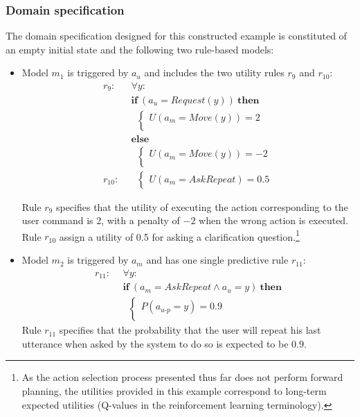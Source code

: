 \subsubsection*{Domain specification}

The domain specification designed for this constructed example is constituted of an empty initial state and the following two rule-based models: \begin{itemize}
\item Model $m_1$ is triggered by $a_u$ and includes the two utility rules $r_{9}$ and $r_{10}$:
\begin{align*}
r_{9}: \ \ & \forall y: \\ 
& \textbf{if} \ (a_u = Request(y)) \ \textbf{then} \\ 
& \; \; \begin{cases} 
U(a_m = Move(y)) = 2 \\ 
\end{cases} \\
& \textbf{else} \\ 
& \; \; \begin{cases} 
U(a_m = Move(y)) = -2 \\ 
\end{cases} \\[4mm]
r_{10}: \ \ &  \; \; \begin{cases} U(a_m = \mathit{AskRepeat}) = 0.5 \end{cases}
\end{align*}

Rule $r_{9}$ specifies that the utility of executing the action corresponding to the user command is 2, with a penalty of $-2$ when the wrong action is executed. Rule $r_{10}$ assign a utility of 0.5 for asking a clarification question.\footnote{As the action selection process presented thus far does not perform forward planning, the utilities provided in this example correspond to long-term expected utilities (Q-values in the reinforcement learning terminology).}

\item Model $m_2$ is triggered by $a_m$ and has one single predictive rule $r_{11}$: 
\begin{align*}
r_{11}: \ \ & \forall y: \\ 
& \textbf{if} \ (a_m = \mathit{AskRepeat} \land a_u=y) \ \textbf{then} \\ 
& \; \;  \begin{cases} 
P(a_{u\mbox{-}p} = y) = 0.9 \\ 
\end{cases}
\end{align*}
Rule $r_{11}$ specifies that the probability that the user will repeat his last utterance when asked by the system to do so is expected to be $0.9$.
\end{itemize}

